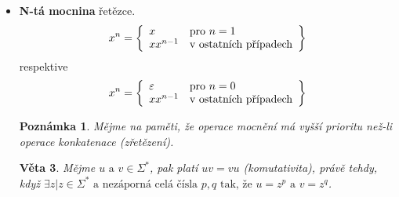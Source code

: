 \documentclass[10pt, a4paper, titlepage]{article}
\theoremstyle{note}
\newtheorem{veta}{\textbf{Věta}}
\newtheorem{poznamka}{\textbf{Poznámka}}
\begin{document}
\begin{itemize}
\begin{itemize}
\item
\textbf{Infix} řetězce. Označme jej $Ifx(x) = \lbrace y | \exists z_{1}, z_{2} \text{ tak, že } z_{1}yz_{2} = x \rbrace$.

\item
\textbf{Sufix} řetězce. Označme jej $Sfx(x) = \lbrace y | \exists z \text{ tak, že } zy = x \rbrace$.
\end{itemize}

\begin{veta}
\begin{gather*}
xy = xz \: \Longrightarrow \: y = z \\
yx = zx \: \Longrightarrow \: y = z
\end{gather*}
Algebraicky je operace zapsána jako $\langle \Sigma^{*}, \cdot, \varepsilon \rangle$.
\end{veta}

\begin{veta}
Vyslovme předpoklad, že platí $xy = uv$. Pak platí právě jedno z těchto tvrzení:
\begin{gather*}
x = u, y = v \\
|x| > |u| \text{ a } \exists w| w \neq \varepsilon, \text{ tak že } x = uw \text{ a } v = wy \\
|x| < |u| \text{ a } \exists w| w \neq \varepsilon, \text{ tak že } u = xw \text{ a } y = wv
\end{gather*}
\end{veta}

\item
\textbf{N-tá mocnina} řetězce.
$$
x^{n} = \left\lbrace
\begin{array}{l l}
x & \text{pro } n=1 \\
xx^{n-1} & \text{v ostatních případech} \\
\end{array}
\right\rbrace
$$
respektive
$$ x^{n} = \left\lbrace
\begin{array}{l l}
\varepsilon & \text{pro } n=0 \\
xx^{n-1} & \text{v ostatních případech} \\
\end{array}
\right\rbrace
$$
\begin{poznamka}
Mějme na paměti, že operace mocnění má vyšší prioritu než-li operace konkatenace (zřetězení).
\end{poznamka}

\begin{veta}
Mějme $u \text{ a } v \in \Sigma^{*}$, pak platí $uv = vu$ (komutativita), právě
tehdy, když $\exists z| z \in \Sigma^{*} \text{ a nezáporná celá čísla } p, q \text{ tak, že } u = z^{p} \text{ a } v=z^{q}$.
\end{veta}


\end{itemize}
\end{document}
